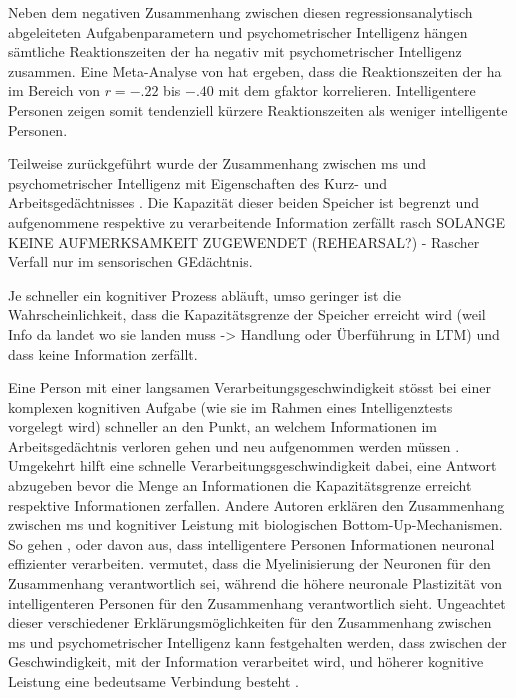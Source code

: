 \documentclass[11pt, twoside, a4paper]{book}		%
\begin{document}
Neben dem negativen Zusammenhang zwischen diesen regressionsanalytisch abgeleiteten Aufgabenparametern und psychometrischer Intelligenz hängen sämtliche  Reaktionszeiten der \gls{ha} negativ mit psychometrischer Intelligenz zusammen. Eine Meta-Analyse von \citet{Sheppard2008} hat ergeben, dass die Reaktionszeiten der \gls{ha} im Bereich von $r=-.22$ bis $-.40$ mit dem \gls{gfaktor} korrelieren. Intelligentere Personen zeigen somit tendenziell kürzere Reaktionszeiten als weniger intelligente Personen. 

Teilweise zurückgeführt wurde der Zusammenhang zwischen \gls{ms} und psychometrischer Intelligenz mit Eigenschaften des Kurz- und Arbeitsgedächtnisses \citep[z. B.][]{Jensen1982a, Jensen1982b, Jensen2006, Vernon1983}. Die Kapazität dieser beiden Speicher ist begrenzt und aufgenommene respektive zu verarbeitende Information zerfällt rasch SOLANGE KEINE AUFMERKSAMKEIT ZUGEWENDET (REHEARSAL?) - Rascher Verfall nur im sensorischen GEdächtnis. 




Je schneller ein kognitiver Prozess abläuft, umso geringer ist die Wahrscheinlichkeit, dass die Kapazitätsgrenze der Speicher erreicht wird (weil Info da landet wo sie landen muss -> Handlung oder Überführung in LTM) und dass keine Information zerfällt. 

Eine Person mit einer langsamen Verarbeitungsgeschwindigkeit stösst bei einer komplexen kognitiven Aufgabe (wie sie im Rahmen eines Intelligenztests vorgelegt wird) schneller an den Punkt, an welchem Informationen im Arbeitsgedächtnis verloren gehen und neu aufgenommen werden müssen \citep{Lehrl1988, Lehrl1990}. Umgekehrt hilft eine schnelle Verarbeitungsgeschwindigkeit dabei, eine Antwort abzugeben bevor die Menge an Informationen die Kapazitätsgrenze erreicht respektive Informationen zerfallen.
Andere Autoren erklären den Zusammenhang zwischen \gls{ms} und kognitiver Leistung mit biologischen Bot\-tom-Up-Mech\-an\-is\-men. So gehen \citet{Bates1995}, \citet{Hendrickson1980} oder \citet{Reed1992} davon aus, dass intelligentere Personen Informationen neuronal effizienter verarbeiten. \citet{Miller1994} vermutet, dass die Myelinisierung der Neuronen für den Zusammenhang verantwortlich sei, während \citet{Garlick2002} die höhere neuronale Plastizität von intelligenteren Personen für den Zusammenhang verantwortlich sieht. Ungeachtet dieser verschiedener Erklärungsmöglichkeiten für den Zusammenhang zwischen \gls{ms} und psychometrischer Intelligenz kann festgehalten werden, dass zwischen der Geschwindigkeit, mit der Information verarbeitet wird, und höherer kognitive Leistung eine bedeutsame Verbindung besteht  \citep[auf manifester wie auch auf latenter Ebene;][]{Neubauer1996, Sheppard2008}.
\end{document}
